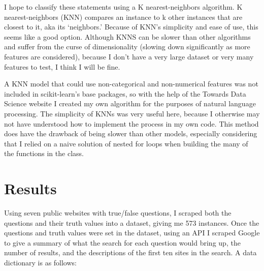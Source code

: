 \documentclass[]{article}
\begin{document}
		I hope to classify these statements using a K nearest-neighbors algorithm. K nearest-neighbors (KNN) compares an instance to k other instances that are closest to it, aka its `neighbors.' Because of KNN's simplicity and ease of use, this seems like a good option. Although KNNS can be slower than other algorithms and suffer from the curse of dimensionality (slowing down significantly as more features are considered), because I don't have a very large dataset or very many features to test, I think I will be fine.
		
		A KNN model that could use non-categorical and non-numerical features was not included in scikit-learn's base packages, so with the help of the Towards Data Science website \cite{tds} I created my own algorithm for the purposes of natural language processing. The simplicity of KNNs was very useful here, because I otherwise may not have understood how to implement the process in my own code. This method does have the drawback of being slower than other models, especially considering that I relied on a naive solution of nested for loops when building the many of the functions in the class.
		
		
		
		
	\section{Results}
	
	
	
		
		
		Using seven public websites with true/false questions, I scraped both the questions and their truth values into a dataset, giving me 573 instances. Once the questions and truth values were set in the dataset, using an API I scraped Google to give a summary of what the search for each question would bring up, the number of results, and the descriptions of the first ten sites in the search. A data dictionary is as follows:
		
\end{document}
